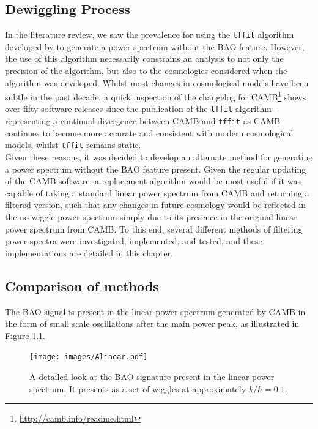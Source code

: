 \documentclass[titlesmallcaps, examinerscopy, copyrightpage]{uqthesis}
\begin{document}
\begin{appendices}


\chapter{Dewiggling Process}

In the literature review, we saw the prevalence for using the \verb;tffit; algorithm developed by \citet{EisensteinHu1998} to generate a power spectrum without the BAO feature. However, the use of this algorithm necessarily constrains an analysis to not only the precision of the algorithm, but also to the cosmologies considered when the algorithm was developed. Whilst most changes in cosmological models have been subtle in the past decade, a quick inspection of the changelog for CAMB\footnote{\url{http://camb.info/readme.html}} \citep{Lewis2000} shows over fifty software releases since the publication of the \verb;tffit; algorithm - representing a continual divergence between CAMB and \verb;tffit; as CAMB continues to become more accurate and consistent with modern cosmological models, whilst \verb;tffit; remains static. \\

Given these reasons, it was decided to develop an alternate method for generating a power spectrum without the BAO feature present. Given the regular updating of the CAMB software, a replacement algorithm would be most useful if it was capable of taking a standard linear power spectrum from CAMB and returning a filtered version, such that any changes in future cosmology would be reflected in the no wiggle power spectrum simply due to its presence in the original linear power spectrum from CAMB. To this end, several different methods of filtering power spectra were investigated, implemented, and tested, and these implementations are detailed in this chapter.

\section{Comparison of methods}

The BAO signal is present in the linear power spectrum generated by CAMB in the form of small scale oscillations after the main power peak, as illustrated in Figure \ref{fig:Alinear}.

\begin{figure}[h]
  \begin{center}
    \texttt{[image: images/Alinear.pdf]}
  	\caption{A detailed look at the BAO signature present in the linear power spectrum. It presents as a set of wiggles at approximately $k/h = 0.1$.}
  	\label{fig:Alinear}
  \end{center}
\end{figure}


\end{appendices}
\end{document}
